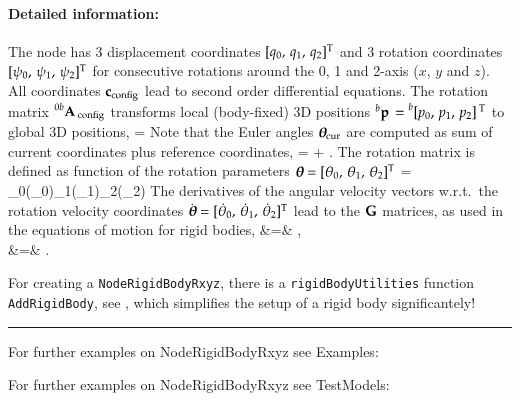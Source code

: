     \paragraph{Detailed information:}
    The node has 3 displacement coordinates $[q_0,\,q_1,\,q_2]^\mathrm{T}$ and 3 rotation coordinates $[\psi_0,\,\psi_1,\,\psi_2]^\mathrm{T}$ for consecutive rotations around the 0, 1 and 2-axis ($x$, $y$ and $z$).
    All coordinates $\mathbf{c}_\mathrm{config}$ lead to second order differential equations.
    The rotation matrix $\prescript{0b}{}{\mathbf{A}}\,_\mathrm{config}$ transforms local (body-fixed) 3D positions $\prescript{b}{}{\mathbf{p}}\, = \prescript{b}{}{[p_0,\,p_1,\,p_2]}\,^\mathrm{T}$ to global 3D positions,
    \be
      \cConfig = \cConfig {} 
    \ee
    Note that the Euler angles $\mbox{\boldmath $\theta$ \unboldmath}\!\!_\mathrm{cur}$ are computed as sum of current coordinates plus reference coordinates,
    \be
      \ttheta\cCur = \tpsi\cCur + \tpsi\cRef.
    \ee
    The rotation matrix is defined as function of the rotation parameters $\mbox{\boldmath $\theta$ \unboldmath}\!\!=[\theta_0,\,\theta_1,\,\theta_2]^\mathrm{T}$
    \be
       = \Rot_0(\theta_0)\Rot_1(\theta_1)\Rot_2(\theta_2)
    \ee
    The derivatives of the angular velocity vectors w.r.t.\ the rotation velocity coordinates $\dot {\mbox{\boldmath $\theta$ \unboldmath}\!\!}=[\dot \theta_0,\,\dot \theta_1,\,\dot \theta_2]^\mathrm{T}$ lead to the $\mathbf{G}$ matrices, as used in the equations of motion for rigid bodies,
    \bea
       &=&  \dot \ttheta, \\
       &=&  \dot \ttheta.
    \eea
    
    For creating a \texttt{NodeRigidBodyRxyz}, there is a \texttt{rigidBodyUtilities} function \texttt{AddRigidBody}, 
    see , which simplifies the setup of a rigid body significantely!
\vspace{6pt}\par\noindent\rule{\textwidth}{0.4pt}
%
\noindent For further examples on NodeRigidBodyRxyz see Examples:
\bi
\item{}\ei

%
%
\noindent For further examples on NodeRigidBodyRxyz see TestModels:
\bi
\item{}\item{}\item{}\item{}\item{}\ei

